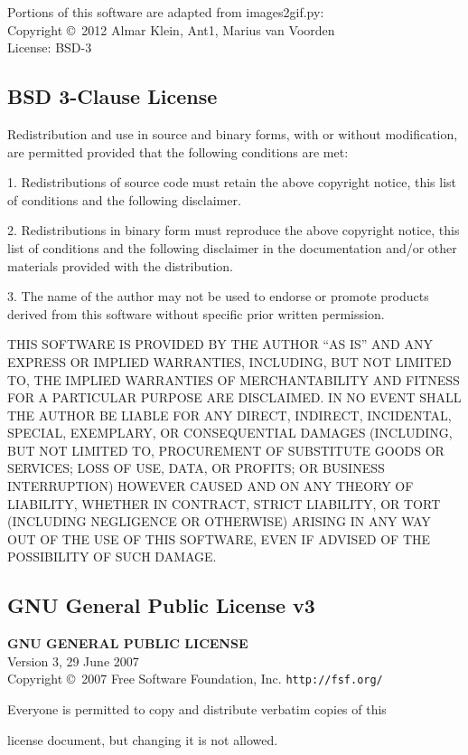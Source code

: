 \documentclass[10pt]{article}
\begin{document}
\noindent Portions of this software are adapted from images2gif.py: \\
Copyright \copyright\ 2012 Almar Klein, Ant1, Marius van Voorden \\
License: BSD-3 \\


\clearpage
\subsection{BSD 3-Clause License}
Redistribution and use in source and binary forms, with or without
modification, are permitted provided that the following conditions
are met:

1. Redistributions of source code must retain the above copyright
   notice, this list of conditions and the following disclaimer.

2. Redistributions in binary form must reproduce the above copyright
   notice, this list of conditions and the following disclaimer in the
   documentation and/or other materials provided with the distribution.

3. The name of the author may not be used to endorse or promote products
   derived from this software without specific prior written permission.

THIS SOFTWARE IS PROVIDED BY THE AUTHOR ``AS IS'' AND ANY EXPRESS OR
IMPLIED WARRANTIES, INCLUDING, BUT NOT LIMITED TO, THE IMPLIED WARRANTIES
OF MERCHANTABILITY AND FITNESS FOR A PARTICULAR PURPOSE ARE DISCLAIMED.
IN NO EVENT SHALL THE AUTHOR BE LIABLE FOR ANY DIRECT, INDIRECT,
INCIDENTAL, SPECIAL, EXEMPLARY, OR CONSEQUENTIAL DAMAGES (INCLUDING, BUT
NOT LIMITED TO, PROCUREMENT OF SUBSTITUTE GOODS OR SERVICES; LOSS OF USE,
DATA, OR PROFITS; OR BUSINESS INTERRUPTION) HOWEVER CAUSED AND ON ANY
THEORY OF LIABILITY, WHETHER IN CONTRACT, STRICT LIABILITY, OR TORT
(INCLUDING NEGLIGENCE OR OTHERWISE) ARISING IN ANY WAY OUT OF THE USE OF
THIS SOFTWARE, EVEN IF ADVISED OF THE POSSIBILITY OF SUCH DAMAGE.

\clearpage
\subsection{GNU General Public License v3}
\begin{center}
{\parindent 0in
\textbf{GNU GENERAL PUBLIC LICENSE}\\
Version 3, 29 June 2007 \\

Copyright \copyright\  2007 Free Software Foundation, Inc. \texttt{http://fsf.org/}

\bigskip
Everyone is permitted to copy and distribute verbatim copies of this

license document, but changing it is not allowed.}

\end{center}
\end{document}

